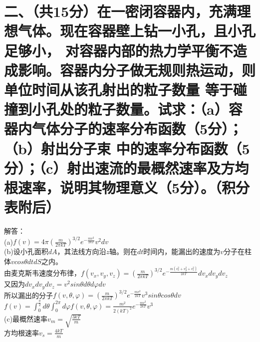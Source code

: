 \documentclass[UTF8]{ctexart}
\begin{document}
\section*{二、（共15分）在一密闭容器内，充满理想气体。现在容器壁上钻一小孔，且小孔足够小，
  对容器内部的热力学平衡不造成影响。容器内分子做无规则热运动，则单位时间从该孔射出的粒子数量
  等于碰撞到小孔处的粒子数量。试求：（a）容器内气体分子的速率分布函数（5分）；（b）射出分子束
  中的速率分布函数（5分）；（c）射出速流的最概然速率及方均根速率，说明其物理意义（5分）。（积分表附后）}
解答：\\
(a)$f(v)=4\pi(\frac{m}{2\pi kT})^{3/2}e^{-\frac{mv^2}{2kT}}v^2dv$\\
(b)设小孔面积$dA$，其法线方向沿$z$轴。则在$dt$时间内，能漏出的速度为$v$分子在柱体$vcos\theta dtdS$之内。\\
由麦克斯韦速度分布律，$f(v_x,v_y,v_z)=(\frac{m}{2\pi kT})^{3/2}
  e^{-\frac{m(v_x^2+v_y^2+v_z^2)}{2kT}}dv_xdv_ydv_z$\\
又因为$dv_xdv_ydv_z=v^2sin\theta d\theta d\varphi dv$\\
所以漏出的分子$f(v,\theta,\varphi)=(\frac{m}{2\pi kT})^{3/2}e^{-\frac{mv^2}{2kT}}v^3sin\theta cos\theta dv$\\
$f(v)=\int_0^{\frac{\pi}{2}}d\theta\int_0^{2\pi}d\varphi f(v,\theta,\varphi)
  =\frac{m^2}{2(kT)^2}e^{-\frac{mv^2}{2kT}}v^3$\\
(c)最概然速率$v_m=\sqrt{\frac{3kT}{m}}$\\
方均根速率$v_s=\frac{4kT}{m}$
\end{document}
